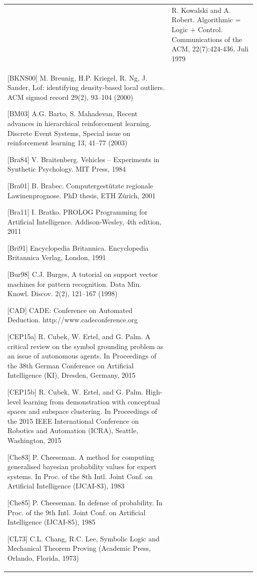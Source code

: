 \documentclass[10pt]{book}
\begin{document}
\begin{tabular}{|l|l|}
\hline [\cite{kowalski1979algorithmic}] & R. Kowalski and A. Robert. Algorithmic = Logic + Control. Communications of the ACM, 22(7):424-436, Juli 1979 \\
[BKNS00] M. Breunig, H.P. Kriegel, R. Ng, J. Sander, Lof: identifying density-based local outliers. ACM sigmod record 29(2), 93–104 (2000)

[BM03] A.G. Barto, S. Mahadevan, Recent advances in hierarchical reinforcement learning. Discrete Event Systems, Special issue on reinforcement learning 13, 41–77 (2003)

[Bra84] V. Braitenberg. Vehicles – Experiments in Synthetic Psychology. MIT Press, 1984

[Bra01] B. Brabec. Computergestützte regionale Lawinenprognose. PhD thesis, ETH Zürich, 2001

[Bra11] I. Bratko. PROLOG Programming for Artificial Intelligence. Addison-Wesley, 4th edition, 2011

[Bri91] Encyclopedia Britannica. Encyclopedia Britannica Verlag, London, 1991

[Bur98] C.J. Burges, A tutorial on support vector machines for pattern recognition. Data Min. Knowl. Discov. 2(2), 121–167 (1998)

[CAD] CADE: Conference on Automated Deduction. http://www.cadeconference.org

[CEP15a] R. Cubek, W. Ertel, and G. Palm. A critical review on the symbol grounding problem as an issue of autonomous agents. In Proceedings of the 38th German Conference on Artificial Intelligence (KI), Dresden, Germany, 2015

[CEP15b] R. Cubek, W. Ertel, and G. Palm. High-level learning from demonstration with conceptual spaces and subspace clustering. In Proceedings of the 2015 IEEE International Conference on Robotics and Automation (ICRA), Seattle, Washington, 2015

[Che83] P. Cheeseman. A method for computing generalised bayesian probability values for expert systems. In Proc. of the 8th Intl. Joint Conf. on Artificial Intelligence (IJCAI-83), 1983

[Che85] P. Cheeseman. In defense of probability. In Proc. of the 9th Intl. Joint Conf. on Artificial Intelligence (IJCAI-85), 1985

[CL73] C.L. Chang, R.C. Lee, Symbolic Logic and Mechanical Theorem Proving (Academic Press, Orlando, Florida, 1973)


\end{tabular}
\end{document}
